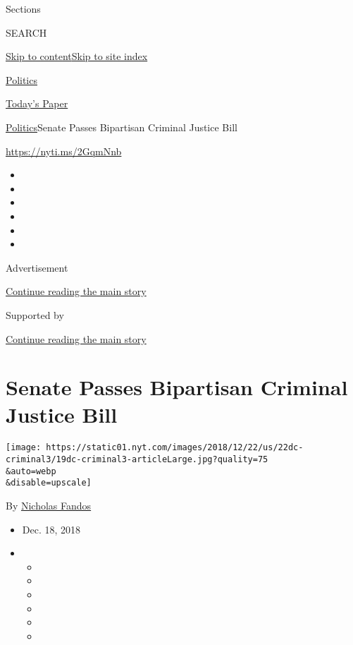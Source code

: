 Sections

SEARCH

\protect\hyperlink{site-content}{Skip to
content}\protect\hyperlink{site-index}{Skip to site index}

\href{https://www.nytimes.com/section/politics}{Politics}

\href{https://myaccount.nytimes.com/auth/login?response_type=cookie\&client_id=vi}{}

\href{https://www.nytimes.com/section/todayspaper}{Today's Paper}

\href{/section/politics}{Politics}\textbar{}Senate Passes Bipartisan
Criminal Justice Bill

\url{https://nyti.ms/2GqmNnb}

\begin{itemize}
\item
\item
\item
\item
\item
\item
\end{itemize}

Advertisement

\protect\hyperlink{after-top}{Continue reading the main story}

Supported by

\protect\hyperlink{after-sponsor}{Continue reading the main story}

\hypertarget{senate-passes-bipartisan-criminal-justice-bill}{%
\section{Senate Passes Bipartisan Criminal Justice
Bill}\label{senate-passes-bipartisan-criminal-justice-bill}}

\texttt{[image: https://static01.nyt.com/images/2018/12/22/us/22dc-criminal3/19dc-criminal3-articleLarge.jpg?quality=75\\\&auto=webp\\\&disable=upscale]}

By \href{https://www.nytimes.com/by/nicholas-fandos}{Nicholas Fandos}

\begin{itemize}
\item
  Dec. 18, 2018
\item
  \begin{itemize}
  \item
  \item
  \item
  \item
  \item
  \item
  \end{itemize}
\end{itemize}


